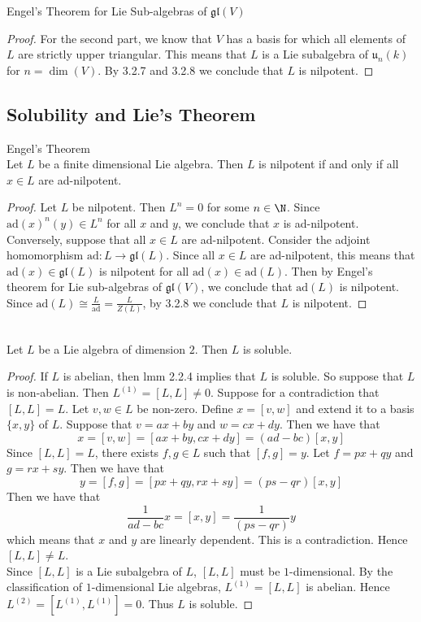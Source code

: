\documentclass[a4paper]{article}
\begin{document}
\begin{prp}{Engel's Theorem for Lie Sub-algebras of $\mathfrak{gl}(V)$}{}
\begin{proof}
For the second part, we know that $V$ has a basis for which all elements of $L$ are strictly upper triangular. This means that $L$ is a Lie subalgebra of $\mathfrak{u}_n(k)$ for $n=\dim(V)$. By 3.2.7 and 3.2.8 we conclude that $L$ is nilpotent. 
\end{proof}
\end{prp}

\subsection{Solubility and Lie's Theorem}
\begin{thm}{Engel's Theorem}{} \\Let $L$ be a finite dimensional Lie algebra. Then $L$ is nilpotent if and only if all $x\in L$ are ad-nilpotent. 
\begin{proof}
Let $L$ be nilpotent. Then $L^n=0$ for some $n\in\N$. Since $\text{ad}(x)^n(y)\in L^n$ for all $x$ and $y$, we conclude that $x$ is ad-nilpotent. \\

Conversely, suppose that all $x\in L$ are ad-nilpotent. Consider the adjoint homomorphism $\text{ad}:L\to\mathfrak{gl}(L)$. Since all $x\in L$ are ad-nilpotent, this means that $\text{ad}(x)\in\mathfrak{gl}(L)$ is nilpotent for all $\text{ad}(x)\in\text{ad}(L)$. Then by Engel's theorem for Lie sub-algebras of $\mathfrak{gl}(V)$, we conclude that $\text{ad}(L)$ is nilpotent. Since $\text{ad}(L)\cong\frac{L}{\text{ad}}=\frac{L}{Z(L)}$, by 3.2.8 we conclude that $L$ is nilpotent. 
\end{proof}
\end{thm}


\begin{prp}{}{} \\Let $L$ be a Lie algebra of dimension $2$. Then $L$ is soluble. 
\begin{proof}
If $L$ is abelian, then lmm 2.2.4 implies that $L$ is soluble. So suppose that $L$ is non-abelian. Then $L^{(1)}=[L,L]\neq 0$. Suppose for a contradiction that $[L,L]=L$. Let $v,w\in L$ be non-zero. Define $x=[v,w]$ and extend it to a basis $\{x,y\}$ of $L$. Suppose that $v=ax+by$ and $w=cx+dy$. Then we have that $$x=[v,w]=[ax+by,cx+dy]=(ad-bc)[x,y]$$ Since $[L,L]=L$, there exists $f,g\in L$ such that $[f,g]=y$. Let $f=px+qy$ and $g=rx+sy$. Then we have that $$y=[f,g]=[px+qy,rx+sy]=(ps-qr)[x,y]$$ Then we have that $$\frac{1}{ad-bc}x=[x,y]=\frac{1}{(ps-qr)}y$$ which means that $x$ and $y$ are linearly dependent. This is a contradiction. Hence $[L,L]\neq L$. \\

Since $[L,L]$ is a Lie subalgebra of $L$, $[L,L]$ must be $1$-dimensional. By the classification of $1$-dimensional Lie algebras, $L^{(1)}=[L,L]$ is abelian. Hence $L^{(2)}=[L^{(1)},L^{(1)}]=0$. Thus $L$ is soluble. 
\end{proof}
\end{prp}
\end{document}
